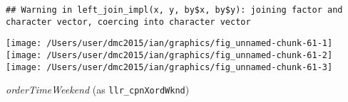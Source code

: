 \documentclass[10pt]{report}
\newenvironment{Shaded}{}{}
\newcommand{\KeywordTok}[1]{\textcolor[rgb]{0.00,0.44,0.13}{\textbf{{#1}}}}
\newcommand{\DataTypeTok}[1]{\textcolor[rgb]{0.56,0.13,0.00}{{#1}}}
\newcommand{\StringTok}[1]{\textcolor[rgb]{0.25,0.44,0.63}{{#1}}}
\newcommand{\NormalTok}[1]{{#1}}
\begin{document}
\begin{Shaded}
\end{Shaded}

\begin{verbatim}
## Warning in left_join_impl(x, y, by$x, by$y): joining factor and character vector, coercing into character vector
\end{verbatim}

\begin{Shaded}
\end{Shaded}

\begin{center}\texttt{[image: /Users/user/dmc2015/ian/graphics/fig\_unnamed-chunk-61-1]} \texttt{[image: /Users/user/dmc2015/ian/graphics/fig\_unnamed-chunk-61-2]} \texttt{[image: /Users/user/dmc2015/ian/graphics/fig\_unnamed-chunk-61-3]} \end{center}

\emph{orderTimeWeekend} (as \texttt{llr\_cpnXordWknd})
\end{document}
